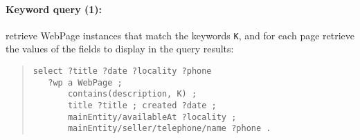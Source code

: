 \paragraph{Keyword query (1):} retrieve WebPage instances that match the keywords \verb|K|, and for each page retrieve the values of the fields to display in the query results:
\begin{quote}
{\footnotesize
\begin{verbatim}
select ?title ?date ?locality ?phone
   ?wp a WebPage ; 
       contains(description, K) ;   
       title ?title ; created ?date ;
       mainEntity/availableAt ?locality ;
       mainEntity/seller/telephone/name ?phone .
\end{verbatim}}
\end{quote}
